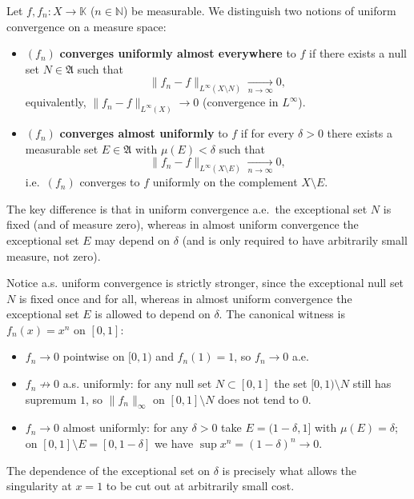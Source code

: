 \begin{definition}
Let $f, f_n : X \to \mathbb{K}$ ($n \in \mathbb{N}$) be measurable. We distinguish two notions of uniform convergence on a measure space:
\begin{itemize}
	\item $(f_n)$ \textbf{converges uniformly almost everywhere} to $f$ if there exists a null set $N \in \mathfrak{A}$ such that
	\begin{equation*}
		\|f_n - f\|_{L^\infty(X \setminus N)} \xrightarrow[n \to \infty]{} 0,
	\end{equation*}
	equivalently, $\|f_n - f\|_{L^\infty(X)} \to 0$ (convergence in $L^\infty$).
	\item $(f_n)$ \textbf{converges almost uniformly} to $f$ if for every $\delta > 0$ there exists a measurable set $E \in \mathfrak{A}$ with $\mu(E) < \delta$ such that
	\begin{equation*}
		\|f_n - f\|_{L^\infty(X \setminus E)} \xrightarrow[n \to \infty]{} 0,
	\end{equation*}
	i.e.\ $(f_n)$ converges to $f$ uniformly on the complement $X \setminus E$.
\end{itemize}
The key difference is that in uniform convergence a.e.\ the exceptional set $N$ is fixed (and of measure zero), whereas in almost uniform convergence the exceptional set $E$ may depend on $\delta$ (and is only required to have arbitrarily small measure, not zero).
\end{definition}
\begin{remark}
Notice a.s. uniform convergence is strictly stronger, since the exceptional null set $N$ is fixed once and for all, whereas in almost uniform convergence the exceptional set $E$ is allowed to depend on $\delta$. The canonical witness is $f_n(x) = x^n$ on $[0, 1]$:
\begin{itemize}
	\item $f_n \to 0$ pointwise on $[0, 1)$ and $f_n(1) = 1$, so $f_n \to 0$ a.e.
	\item $f_n \not\to 0$ a.s. uniformly: for any null set $N \subset [0, 1]$ the set $[0, 1) \setminus N$ still has supremum $1$, so $\|f_n\|_\infty$ on $[0, 1] \setminus N$ does not tend to $0$.
	\item $f_n \to 0$ almost uniformly: for any $\delta > 0$ take $E = (1 - \delta, 1]$ with $\mu(E) = \delta$; on $[0, 1] \setminus E = [0, 1 - \delta]$ we have $\sup x^n = (1 - \delta)^n \to 0$.
\end{itemize}
The dependence of the exceptional set on $\delta$ is precisely what allows the singularity at $x = 1$ to be cut out at arbitrarily small cost.
\end{remark}

